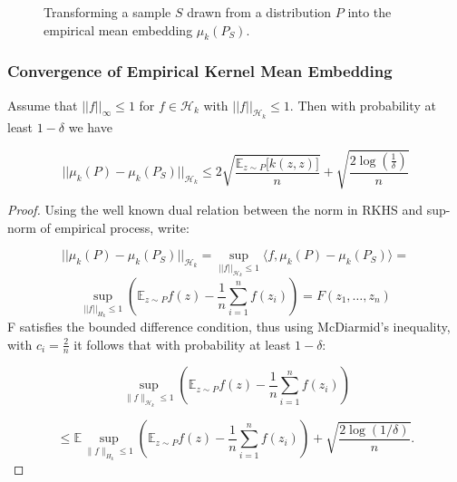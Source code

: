\documentclass{beamer}
\renewcommand{\H}{\mathcal{H}}
\begin{document}
\begin{frame}
\begin{figure}
\begin{center}
{
		}
	\end{center}
	\caption{Transforming a sample $S$ drawn from a distribution $P$ into the empirical mean embedding $\mu_k(P_S)$.}
	\label{fig:embedding}
\end{figure}
\end{frame}

\begin{frame}
\frametitle{Convergence of Empirical Kernel Mean Embedding}
\begin{theorem}
\label{theorem1}
Assume that $||f||_\infty \leq 1$ for $f\in \H_k$ with $||f||_{\H_k} \leq 1$. Then with probability at least $1-\delta$ we have

$$||\mu_k(P) - \mu_k(P_S)||_{\H_k} \leq 2\sqrt{\frac{\mathbb{E}_{z\sim P}\Big[ k(z, z)\Big]} {n}} + \sqrt{\frac{2\log(\frac{1}{\delta})}{n}}$$
\end{theorem}
\end{frame}


\begin{frame}
\begin{proof}
	Using the well known dual relation between the norm in RKHS and
	sup-norm of empirical process, write:
	
	$$||\mu_k(P)-\mu_k(P_S)||_{\H_k} =\sup_{||f||_{\H_k}\leq 1} \langle f, \mu_k(P) - \mu_k(P_S) \rangle = $$
	$$\sup_{||f||_{H_k}\leq 1}
	\left(\mathbb{E}_{z\sim P}{f(z)}-\frac{1}{n}\sum_{i=1}^n f(z_i)\right) =  F(z_1, \dots, z_n)
	$$
	F satisfies the bounded difference condition, thus using McDiarmid's inequality, with $c_i = \frac{2}{n}$ it follows that with probability at least $1-\delta$:
	
	$$
	\sup_{\|f\|_{\H_k}\leq 1}\left(
	\mathbb{E}_{z\sim P}{f(z)} - \frac{1}{n}\sum_{i=1}^n f(z_i)\right)$$
	
	$$
	\leq
	\mathbb{E}{}{\sup_{\|f\|_{H_k}\leq 1}\left(
		\mathbb{E}_{z\sim P}{f(z)}
		-
		\frac{1}{n}\sum_{i=1}^n f(z_i)
		\right)}
	+
	\sqrt{\frac{2\log(1/\delta)}{n}}.
	$$
\end{proof}
\end{frame}
\end{document}
